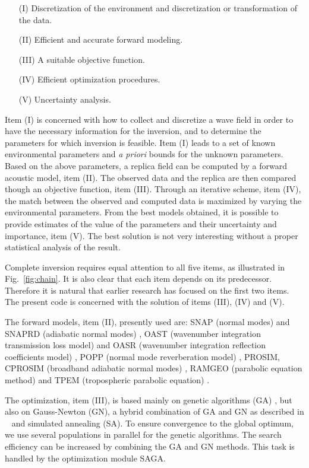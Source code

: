 \documentclass{saclantc}
\begin{document}
\begin{itemize}
\item[(I)] Discretization of the environment and discretization 
              or transformation of the data.
\item[(II)] Efficient and accurate forward modeling.
\item[(III)] A suitable objective function.
\item[(IV)] Efficient optimization procedures.
\item[(V)] Uncertainty analysis.
\end{itemize}
Item (I) is concerned with how to collect and discretize a wave field
in order to have the necessary information for the
inversion, and to determine the parameters for which inversion is
feasible.  Item (I) leads to a set of known environmental parameters
and {\it a priori} bounds for the unknown parameters. Based on the
above parameters, a replica field can be computed by a forward
acoustic model, item (II).  The observed data and the replica are then
compared though an objective function, item (III).  Through an
iterative scheme, item (IV), the match between the observed and
computed data is maximized by varying the environmental
parameters. From the best models obtained, it is possible to provide
estimates of the value of the parameters and their uncertainty and
importance, item (V).  The best solution is not very interesting
without a proper statistical analysis of the result.

Complete inversion requires equal attention to all five items, as
illustrated in Fig.~\ref{fig:chain}.  It is also clear that each item
depends on its predecessor. Therefore it is natural that earlier
research has focused on the first two items. The present code is
concerned with the solution of items (III), (IV) and (V).

The forward models, item (II), presently used are:
{\sf SNAP} (normal modes) and
{\sf SNAPRD} (adiabatic normal modes) \cite{snap}, 
{\sf OAST} (wavenumber integration transmission loss model) and 
{\sf OASR} (wavenumber integration reflection coefficients model) 
\cite{hs:saf,hs:saf2},  
{\sf POPP} (normal mode reverberation model) \cite{ellis:asa95}, 
{\sf PROSIM, CPROSIM} (broadband adiabatic normal modes) 
\cite{prosim,levinson:asa95,westwood:asa96},
{\sf RAMGEO} (parabolic equation method) \cite{colins:ram,colins:asa93}
 and  {\sf TPEM} (tropospheric parabolic equation)
\cite{barrios:92,barrios:94}.

The optimization, item (III), is based mainly on genetic algorithms
(GA) \cite{gerstoft:asa94}, but also on Gauss-Newton (GN), a hybrid
combination of GA and GN as described in \mbox{
\cite{gerstoft:asa94,gerstoft:asa95}} and simulated annealing (SA).
To ensure convergence to the global optimum, we
use several populations in parallel for the genetic algorithms. The
search efficiency can be increased by combining the GA and GN methods.
This task is handled by the optimization module {\sf SAGA}.
\end{document}
